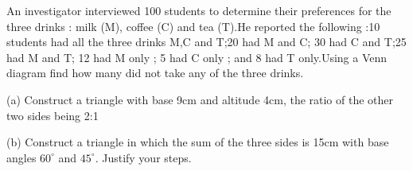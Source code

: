 \iffalse
\title{Assignment 2}
\author{AI24BTECH11014 - Charitha Sri}
\section{subjective}
\fi
\item An investigator interviewed 100 students to determine their preferences for the three drinks : milk (M), coffee (C) and tea (T).He reported the following :10 students had all the three drinks M,C and T;20 had M and C; 30 had C and T;25 had M and T; 12 had M only ; 5 had C only ; and 8 had T only.Using a Venn diagram find how many did not take any of the three drinks. \hfill{}
	\item (a) Construct a triangle with base 9cm and altitude 4cm, the ratio of the other two sides being 2:1
		
		(b) Construct a triangle in which the sum of the three sides is 15cm with base angles $60^\circ$ and $45^\circ$. Justify your steps. \hfill{}
